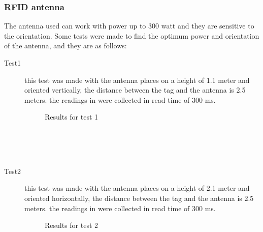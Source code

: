 \documentclass[a4paper,twoside]{IEEEtran}
\begin{document}
\subsubsection{RFID antenna}
The antenna used can work with power up to 300 watt and they are sensitive to the orientation. Some tests were made to find the optimum power and orientation of the antenna, and they are as follows:
\begin{description}
\item[Test1] 
this test was made with the antenna places on a height of 1.1 meter and oriented vertically, the distance between the tag and the antenna is 2.5 meters. the readings in  were collected in read time of 300 ms.
\begin{figure}[ht]
\centering
{}
\caption{Results for test 1}
\label{read1}
\end{figure}
\\
\\
\\
\item[Test2] 
this test was made with the antenna places on a height of 2.1 meter and oriented horizontally, the distance between the tag and the antenna is 2.5 meters. the readings in  were collected in read time of 300 ms.
\begin{figure}[h]
\centering
{}
\caption{Results for test 2}
\label{read2}
\end{figure}

\end{description}
\end{document}
